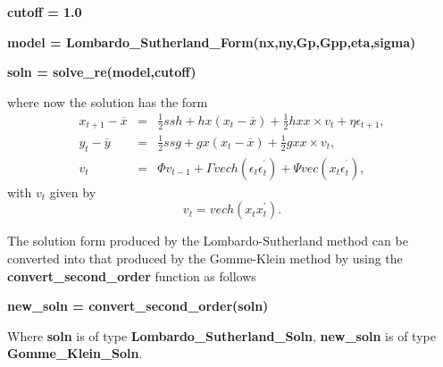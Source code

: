 \documentclass[thmsa,notitlepage,11pt]{article}
\begin{document}
\textbf{cutoff = 1.0}

\textbf{model = Lombardo\_Sutherland\_Form(nx,ny,Gp,Gpp,eta,sigma)}

\textbf{soln = solve\_re(model,cutoff)}

\bigskip

where now the solution has the form%
\begin{eqnarray*}
x_{t+1}-\overline{x} &=&\frac{1}{2}ssh+hx\left( x_{t}-\overline{x}\right) +%
\frac{1}{2}hxx\times v_{t}+\eta \epsilon _{t+1}, \\
y_{t}-\overline{y} &=&\frac{1}{2}ssg+gx\left( x_{t}-\overline{x}\right) +%
\frac{1}{2}gxx\times v_{t}, \\
v_{t} &=&\Phi v_{t-1}+\Gamma vech\left( \epsilon _{t}\epsilon _{t}^{^{\prime
}}\right) +\Psi vec\left( x_{t}\epsilon _{t}^{^{\prime }}\right) ,
\end{eqnarray*}%
with $v_{t}$ given by%
\[
v_{t}=vech\left( x_{t}x_{t}^{\prime }\right) . 
\]

The solution form produced by the Lombardo-Sutherland method can be
converted into that produced by the Gomme-Klein method by using the \textbf{%
convert\_second\_order} function as follows

\bigskip

\textbf{new\_soln = convert\_second\_order(soln)}

\bigskip

Where \textbf{soln} is of type \textbf{Lombardo\_Sutherland\_Soln}, \textbf{%
new\_soln} is of type \textbf{Gomme\_Klein\_Soln}.

\setlength{\baselineskip}{10pt}
\end{document}
